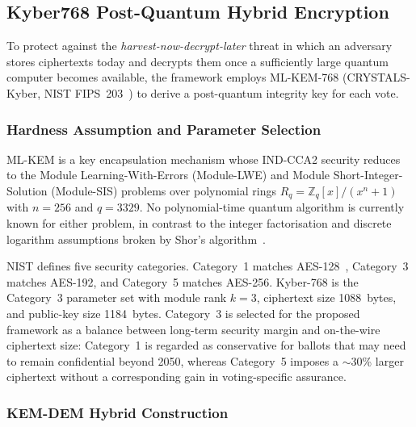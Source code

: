 \subsection{Kyber768 Post-Quantum Hybrid Encryption}
\label{subsec:kyber}

To protect against the \emph{harvest-now-decrypt-later} threat in which an adversary stores ciphertexts today and decrypts them once a sufficiently large quantum computer becomes available, the framework employs ML-KEM-768 (CRYSTALS-Kyber, NIST FIPS~203~\cite{nist_kyber}) to derive a post-quantum integrity key for each vote.

\subsubsection{Hardness Assumption and Parameter Selection}
\label{subsubsec:kyber-hardness}

ML-KEM is a key encapsulation mechanism whose IND-CCA2 security reduces to the Module Learning-With-Errors (Module-LWE) and Module Short-Integer-Solution (Module-SIS) problems over polynomial rings $R_q = \mathbb{Z}_q[x]/(x^n + 1)$ with $n = 256$ and $q = 3329$. No polynomial-time quantum algorithm is currently known for either problem, in contrast to the integer factorisation and discrete logarithm assumptions broken by Shor's algorithm~\cite{shor1997}.

NIST defines five security categories. Category~1 matches AES-128~\cite{nist_aes}, Category~3 matches AES-192, and Category~5 matches AES-256. Kyber-768 is the Category~3 parameter set with module rank $k = 3$, ciphertext size 1088~bytes, and public-key size 1184~bytes. Category~3 is selected for the proposed framework as a balance between long-term security margin and on-the-wire ciphertext size: Category~1 is regarded as conservative for ballots that may need to remain confidential beyond 2050, whereas Category~5 imposes a $\sim$30\% larger ciphertext without a corresponding gain in voting-specific assurance.

\subsubsection{KEM-DEM Hybrid Construction}
\label{subsubsec:hybrid}

